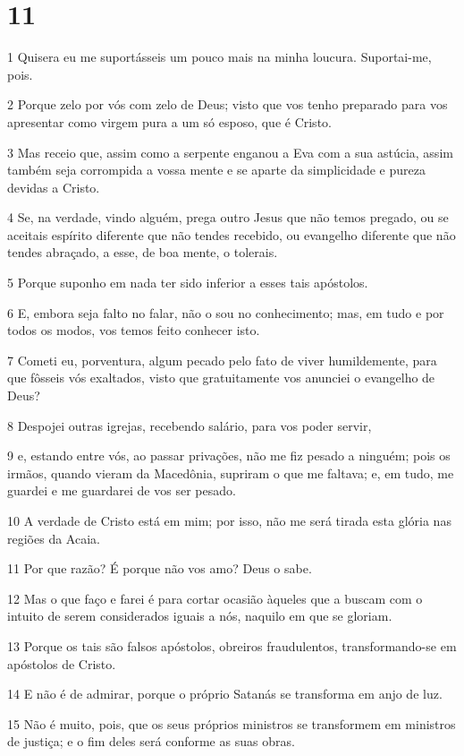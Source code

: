 \chapter{11}

\par 1 Quisera eu me suportásseis um pouco mais na minha loucura. Suportai-me, pois.
\par 2 Porque zelo por vós com zelo de Deus; visto que vos tenho preparado para vos apresentar como virgem pura a um só esposo, que é Cristo.
\par 3 Mas receio que, assim como a serpente enganou a Eva com a sua astúcia, assim também seja corrompida a vossa mente e se aparte da simplicidade e pureza devidas a Cristo.
\par 4 Se, na verdade, vindo alguém, prega outro Jesus que não temos pregado, ou se aceitais espírito diferente que não tendes recebido, ou evangelho diferente que não tendes abraçado, a esse, de boa mente, o tolerais.
\par 5 Porque suponho em nada ter sido inferior a esses tais apóstolos.
\par 6 E, embora seja falto no falar, não o sou no conhecimento; mas, em tudo e por todos os modos, vos temos feito conhecer isto.
\par 7 Cometi eu, porventura, algum pecado pelo fato de viver humildemente, para que fôsseis vós exaltados, visto que gratuitamente vos anunciei o evangelho de Deus?
\par 8 Despojei outras igrejas, recebendo salário, para vos poder servir,
\par 9 e, estando entre vós, ao passar privações, não me fiz pesado a ninguém; pois os irmãos, quando vieram da Macedônia, supriram o que me faltava; e, em tudo, me guardei e me guardarei de vos ser pesado.
\par 10 A verdade de Cristo está em mim; por isso, não me será tirada esta glória nas regiões da Acaia.
\par 11 Por que razão? É porque não vos amo? Deus o sabe.
\par 12 Mas o que faço e farei é para cortar ocasião àqueles que a buscam com o intuito de serem considerados iguais a nós, naquilo em que se gloriam.
\par 13 Porque os tais são falsos apóstolos, obreiros fraudulentos, transformando-se em apóstolos de Cristo.
\par 14 E não é de admirar, porque o próprio Satanás se transforma em anjo de luz.
\par 15 Não é muito, pois, que os seus próprios ministros se transformem em ministros de justiça; e o fim deles será conforme as suas obras.

